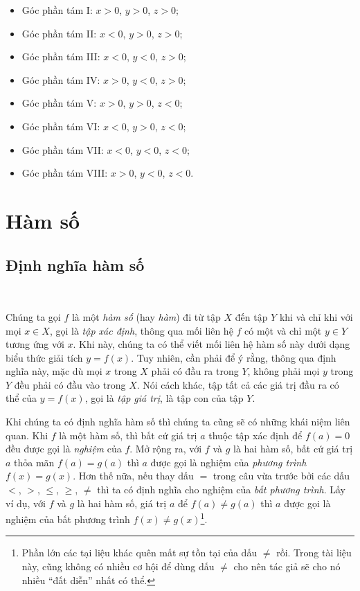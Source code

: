 \documentclass[a4paper, titlepage, openany]{book}
\newcommand\dblquote[1]{\textquotedblleft #1\textquotedblright}
\begin{document}
\begin{itemize}
   \item Góc phần tám I: $x>0$, $y>0$, $z>0$;
   \item Góc phần tám II: $x<0$, $y>0$, $z>0$;
   \item Góc phần tám III: $x<0$, $y<0$, $z>0$;
   \item Góc phần tám IV: $x>0$, $y<0$, $z>0$;
   \item Góc phần tám V: $x>0$, $y>0$, $z<0$;
   \item Góc phần tám VI: $x<0$, $y>0$, $z<0$;
   \item Góc phần tám VII: $x<0$, $y<0$, $z<0$;
   \item Góc phần tám VIII: $x>0$, $y<0$, $z<0$.
\end{itemize}


\section{Hàm số}

\subsection{Định nghĩa hàm số}

\ %

Chúng ta gọi $f$ là một \emph{hàm số} (hay \emph{hàm}) đi từ tập $X$ đến tập $Y$ khi và chỉ khi với mọi $x\in X$, gọi là \emph{tập xác định}, thông qua mối liên hệ $f$ có một và chỉ một $y\in Y$ tương ứng với $x$. Khi này, chúng ta có thể viết mối liên hệ hàm số này dưới dạng biểu thức giải tích $y=f(x)$. Tuy nhiên, cần phải để ý rằng, thông qua định nghĩa này, mặc dù mọi $x$ trong $X$ phải có đầu ra trong $Y$, không phải mọi $y$ trong $Y$ đều phải có đầu vào trong $X$. Nói cách khác, tập tất cả các giá trị đầu ra có thể của $y=f(x)$, gọi là \emph{tập giá trị}, là tập con của tập $Y$.

Khi chúng ta có định nghĩa hàm số thì chúng ta cũng sẽ có những khái niệm liên quan. Khi $f$ là một hàm số, thì bất cứ giá trị $a$ thuộc tập xác định để $f(a) = 0$ đều được gọi là \emph{nghiệm} của $f$. Mở rộng ra, với $f$ và $g$ là hai hàm số, bất cứ giá trị $a$ thỏa mãn $f(a) = g(a)$ thì $a$ được gọi là nghiệm của \emph{phương trình} $f(x) = g(x)$. Hơn thế nữa, nếu thay dấu $=$ trong câu vừa trước bởi các dấu $<$, $>$, $\leq$, $\geq$, $\neq$ thì ta có định nghĩa cho nghiệm của \emph{bất phương trình}. Lấy ví dụ, với $f$ và $g$ là hai hàm số, giá trị $a$ để $f(a) \neq g(a)$ thì $a$ được gọi là nghiệm của bất phương trình $f(x) \neq g(x)$\footnote{Phần lớn các tại liệu khác quên mất sự tồn tại của dấu $\neq$ rồi. Trong tài liệu này, cũng không có nhiều cơ hội để dùng dấu $\neq$ cho nên tác giả sẽ cho nó nhiều \dblquote{đất diễn} nhất có thể.}.
\end{document}
